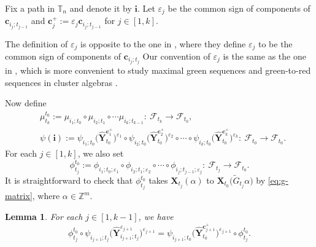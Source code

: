 \documentclass[pdftex]{sigma}
\newcommand{\Z}{\mathbb{Z}}
\numberwithin{equation}{section}
\newtheorem{Lemma}[Theorem]{Lemma}
\begin{document}
Fix a path  in $\mathbb{T}_n$ and denote it by $\mathbf{i}$. Let $\varepsilon_{j}$ be the common sign of components of $\mathbf{c}_{i_j;t_{j-1}}$ and $\mathbf{c}_{j}^{+}:=\varepsilon_{j}\mathbf{c}_{i_j;t_{j-1}}$ for $j\in[1,k]$.
\begin{Remark}
 The definition of $\varepsilon_j$ is opposite to the one in \cite{LMN2023}, where they define $\varepsilon_j$ to be the common sign of components of $\mathbf{c}_{i_j;t_j}$
 Our convention of $\varepsilon_{j}$ is the same as the one in \cite{Keller2012}, which is more convenient to study maximal green sequences and green-to-red sequences in cluster algebras \cite{KD2020}.
\end{Remark}
Now define
\begin{align*}
&\mu_{t_k}^{t_0}:=\mu_{i_1;t_0}\circ\mu_{i_2;t_1}\circ\cdots\mu_{i_k;t_{k-1}}\colon\ \mathcal{F}_{t_k}\to\mathcal{F}_{t_0},\\
&\psi(\mathbf{i}):=\psi_{i_1;t_0}\bigl(\mathbf{\hat{Y}}_{t_0}^{\mathbf{c}_{1}^+}\bigr)^{\varepsilon_1}\circ\psi_{i_2;t_0}\bigl(\mathbf{\hat{Y}}_{t_0}^{\mathbf{c}_{2}^+}\bigr)^{\varepsilon_2}\circ\cdots\circ\psi_{i_k;t_0}\bigl(\mathbf{\hat{Y}}_{t_0}^{\mathbf{c}_{k}^+}\bigr)^{\varepsilon_k}\colon\ \mathcal{F}_{t_0}\to\mathcal{F}_{t_0}.
\end{align*}
For each $j\in [1,k]$, we also set
\[
\phi_{t_{j}}^{t_0}:=\phi_{i_1;t_{0};\varepsilon_{1}}\circ\phi_{i_2;t_{1};\varepsilon_{2}}\circ\cdots\circ\phi_{i_j;t_{j-1};\varepsilon_{j}}\colon\ \mathcal{F}_{t_{j}}\to\mathcal{F}_{t_{0}}.
\]
It is straightforward to check that $\phi_{t_{j}}^{t_0}$ takes $\mathbf{X}_{t_{j}}(\alpha)$ to $\mathbf{X}_{t_{0}}\bigl(\tilde{G}_{t_{j}}\alpha\bigr)$ by \eqref{eq:g-matrix}, where $\alpha\in \Z^m$.
\begin{Lemma}\label{l:commutative-diag-isom}
 For each $j\in [1,k-1]$, we have
\[
 \phi_{t_{j}}^{t_{0}}\circ\psi_{i_{j+1};t_{j}}\bigl(\mathbf{\hat{Y}}^{\varepsilon_{j+1}}_{i_{j+1};t_{j}}\bigr)^{\varepsilon_{j+1}}
 =\psi_{i_{j+1};t_{0}}\bigl(\mathbf{\hat{Y}}_{t_{0}}^{\mathbf{c}_{j+1}^{+}}\bigr)^{\varepsilon_{j+1}}\circ\phi_{t_{j}}^{t_{0}}.
 \]
\end{Lemma}
\end{document}
